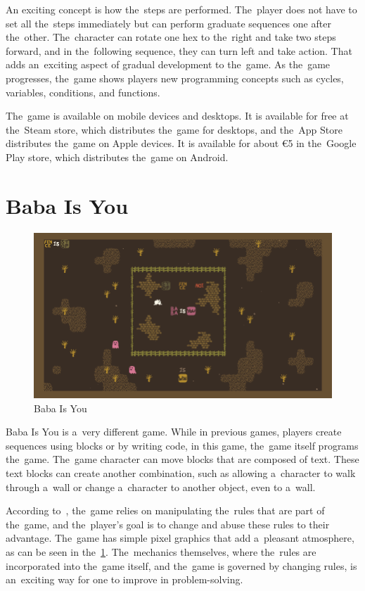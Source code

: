 An exciting concept is how the~steps are performed.
The~player does not have to set all the~steps immediately but can perform graduate sequences one after the~other.
The~character can rotate one hex to the~right and take two steps forward, and in the~following sequence, they can turn left and take action.
That adds an~exciting aspect of gradual development to the~game.
As the~game progresses, the~game shows players new programming concepts such as cycles, variables, conditions, and functions. 

The~game is available on mobile devices and desktops.
It is available for free at the~Steam store, which distributes the~game for desktops, and the~App Store distributes the~game on Apple devices.
It is available for about €5 in the~Google Play store, which distributes the~game on Android.

\section{Baba Is You}

\begin{figure}
    \centering
    \includegraphics[width=1\linewidth]{assets/similar-games/baba.png}
    \caption{Baba Is You~\cite{a2022_baba}}
    \label{fig:babaisyou}
\end{figure}

Baba Is You is a~very different game.
While in previous games, players \mbox{create} sequences using blocks or by writing code, in this game, the~game itself programs the~game.
The~game character can move blocks that are composed of text.
These text blocks can create another combination, such as allowing a~character to walk through a~wall or change a~character to another object, even to a~wall.

According to~\cite{a2022_baba}, the~game relies on manipulating the~rules that are part of the~game, and the~player's goal is to change and abuse these rules to their advantage.
The~game has simple pixel graphics that add a~pleasant atmosphere, as can be seen in the~\ref {fig:babaisyou}.
The~mechanics themselves, where the~rules are incorporated into the~game itself, and the~game is governed by changing rules, is an~exciting way for one to improve in problem-solving.

